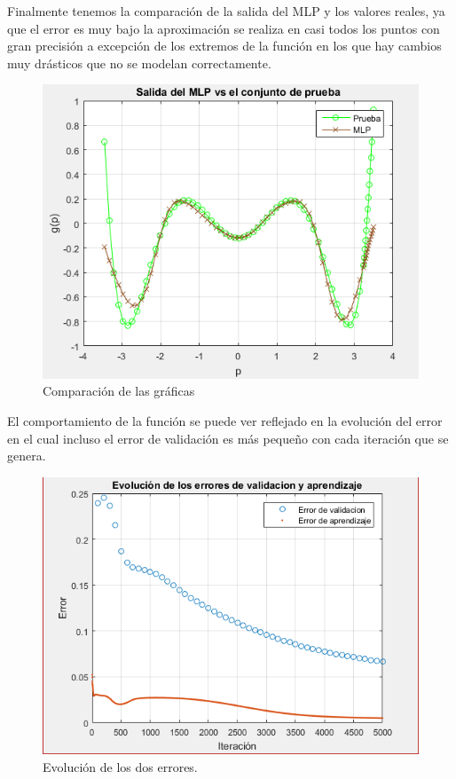 Finalmente tenemos la comparación de la salida del MLP y los valores reales, ya que el error es muy bajo la aproximación se realiza en casi todos los puntos con gran precisión a excepción de los extremos de la función en los que hay cambios muy drásticos que no se modelan correctamente.
\begin{figure}[H]
    \begin{center}
        \includegraphics[width=12cm]{3/prueba.png}
        \caption{Comparación de las gráficas}
        \label{fig:prueba3}
    \end{center}
\end{figure}
El comportamiento de la función se puede ver reflejado en la evolución del error en el cual incluso el error de validación es más pequeño con cada iteración que se genera.
\begin{figure}[H]
    \begin{center}
        \includegraphics[width=12cm]{3/error.png}
        \caption{Evolución de los dos errores.}
        \label{fig:error3}
    \end{center}
\end{figure}
\newpage
